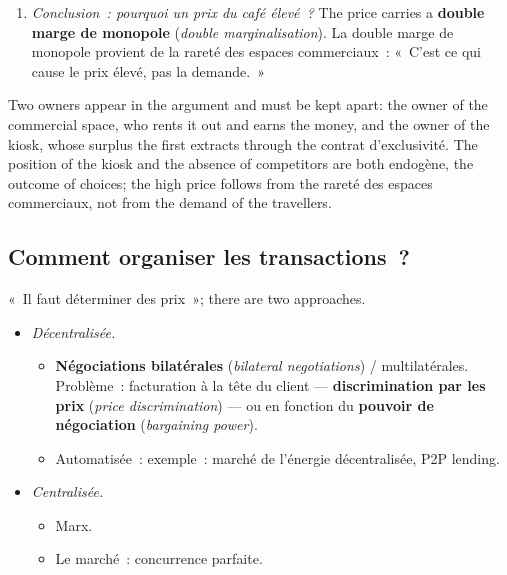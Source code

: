 \begin{example}
\begin{enumerate}
      kiosques qui se font concurrence~», or offer a single kiosk a
      \textbf{contrat d'exclusivité} (\textit{exclusive contract}). The answer is
      in the question: the contrat d'exclusivité lets the owner of the space take the surplus of the
      kiosk's owner, an \textbf{extraction du surplus} (\textit{surplus extraction}) ---
      «~extraction du surplus du propriétaire du kiosque~; exemple~: enchère au
      second prix~».
    \item \emph{Conclusion~: pourquoi un prix du café élevé~?} The price carries a
      \textbf{double marge de monopole} (\textit{double marginalisation}). La
      double marge de monopole provient de la rareté des espaces commerciaux~:
      «~C'est ce qui cause le prix élevé, pas la demande.~»
  \end{enumerate}
\end{example}

Two owners appear in the argument and must be kept apart: the owner of the
commercial space, who rents it out and earns the money, and the owner of the
kiosk, whose surplus the first extracts through the contrat d'exclusivité. The position
of the kiosk and the absence of competitors are both endogène, the outcome of
choices; the high price follows from the rareté des espaces commerciaux, not from
the demand of the travellers.

\subsection{Comment organiser les transactions~?}

«~Il faut déterminer des prix~»; there are two approaches.

\begin{itemize}
  \item \emph{Décentralisée.}
    \begin{itemize}
      \item \textbf{Négociations bilatérales} (\textit{bilateral negotiations})
        / multilatérales. Problème~: facturation à la tête du client ---
        \textbf{discrimination par les prix} (\textit{price discrimination}) ---
        ou en fonction du \textbf{pouvoir de négociation} (\textit{bargaining
        power}).
      \item Automatisée~: exemple~: marché de l'énergie décentralisée, P2P
        lending.
    \end{itemize}
  \item \emph{Centralisée.}
    \begin{itemize}
      \item Marx.
      \item Le marché~: concurrence parfaite.
    \end{itemize}
\end{itemize}


